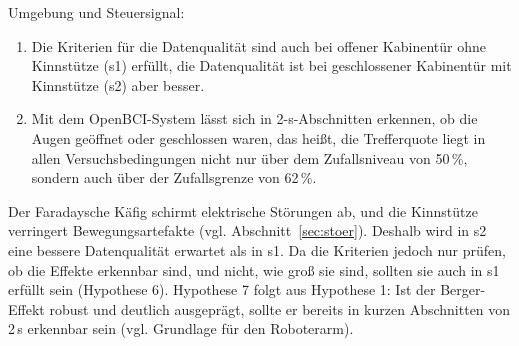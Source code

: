 Umgebung und Steuersignal:
\begin{enumerate}[label=Hypothese \arabic*:, leftmargin=*, align=left, resume]
    \item Die Kriterien für die Datenqualität sind auch bei offener Kabinentür ohne Kinnstütze (s1) erfüllt, die Datenqualität ist bei geschlossener Kabinentür mit Kinnstütze (s2) aber besser.
    \item Mit dem OpenBCI-System lässt sich in 2-s-Abschnitten erkennen, ob die Augen geöffnet oder geschlossen waren, das heißt, die Trefferquote liegt in allen Versuchsbedingungen nicht nur über dem Zufallsniveau von 50\,\%, sondern auch über der Zufallsgrenze von 62\,\%.
\end{enumerate}
Der Faradaysche Käfig schirmt elektrische Störungen ab, und die Kinnstütze verringert Bewegungsartefakte (vgl. Abschnitt~\ref{sec:stoer}). Deshalb wird in s2 eine bessere Datenqualität erwartet als in s1. Da die Kriterien jedoch nur prüfen, ob die Effekte erkennbar sind, und nicht, wie groß sie sind, sollten sie auch in s1 erfüllt sein (Hypothese 6). Hypothese 7 folgt aus Hypothese 1: Ist der Berger-Effekt robust und deutlich ausgeprägt, sollte er bereits in kurzen Abschnitten von 2\,s erkennbar sein (vgl. Grundlage für den Roboterarm).

